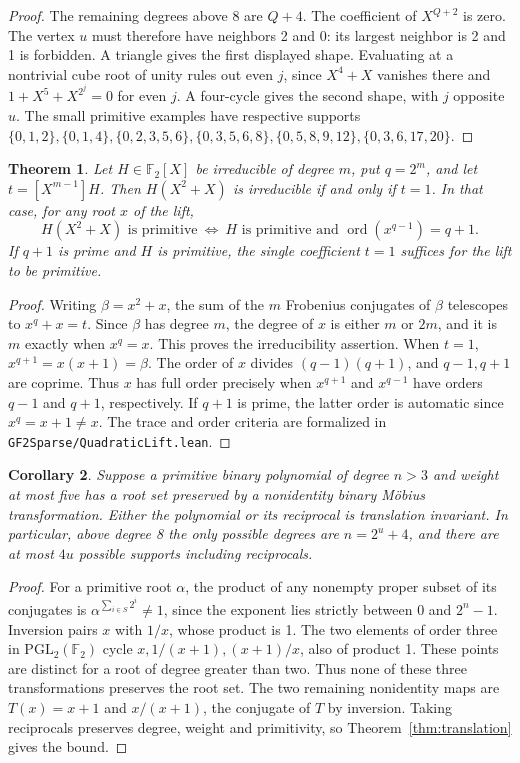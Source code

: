\documentclass[11pt]{article}
\newtheorem{theorem}{Theorem}
\newtheorem{corollary}[theorem]{Corollary}
\newcommand{\F}{\mathbb F_2}
\newcommand{\ord}{\operatorname{ord}}
\begin{document}
\begin{proof}
The remaining degrees above 8 are \(Q+4\). The coefficient of
\(X^{Q+2}\) is zero. The vertex \(u\) must therefore have neighbors
2 and 0: its largest neighbor is 2 and 1 is forbidden. A triangle
gives the first displayed shape. Evaluating at a nontrivial cube
root of unity rules out even \(j\), since \(X^4+X\) vanishes
there and \(1+X^5+X^{2^j}=0\) for even \(j\).
A four-cycle gives the second shape, with \(j\) opposite \(u\).
The small primitive examples have respective supports
\(\{0,1,2\},\{0,1,4\},\{0,2,3,5,6\},\{0,3,5,6,8\},
\{0,5,8,9,12\},\{0,3,6,17,20\}\).
\end{proof}

\begin{theorem}\label{thm:lift-order}
Let \(H\in\F[X]\) be irreducible of degree \(m\), put \(q=2^m\), and
let \(t=[X^{m-1}]H\). Then \(H(X^2+X)\) is irreducible if and only
if \(t=1\). In that case, for any root \(x\) of the lift,
\[
 H(X^2+X)\text{ is primitive}
 \ \Longleftrightarrow\ H\text{ is primitive and }\ord(x^{q-1})=q+1 .
\]
If \(q+1\) is prime and \(H\) is primitive, the single coefficient
\(t=1\) suffices for the lift to be primitive.
\end{theorem}
\begin{proof}
Writing \(\beta=x^2+x\), the sum of the \(m\) Frobenius conjugates
of \(\beta\) telescopes to \(x^q+x=t\). Since \(\beta\) has degree
\(m\), the degree of \(x\) is either \(m\) or \(2m\), and it is \(m\)
exactly when \(x^q=x\). This proves the irreducibility assertion.
When \(t=1\), \(x^{q+1}=x(x+1)=\beta\). The order of \(x\) divides
\((q-1)(q+1)\), and \(q-1,q+1\) are coprime. Thus \(x\) has full
order precisely when \(x^{q+1}\) and \(x^{q-1}\) have orders
\(q-1\) and \(q+1\), respectively. If \(q+1\) is prime, the latter
order is automatic since \(x^q=x+1\ne x\). The trace and order
criteria are formalized in \texttt{GF2Sparse/QuadraticLift.lean}.
\end{proof}

\begin{corollary}\label{cor:mobius}
Suppose a primitive binary polynomial of degree \(n>3\) and weight
at most five has a root set preserved by a nonidentity binary
Möbius transformation. Either the polynomial or its reciprocal is
translation invariant. In particular, above degree 8 the only possible
degrees are \(n=2^u+4\), and there are at most \(4u\) possible supports
including reciprocals.
\end{corollary}
\begin{proof}
For a primitive root \(\alpha\), the product of any nonempty proper
subset of its conjugates is \(\alpha^{\sum_{i\in S}2^i}\ne1\), since
the exponent lies strictly between 0 and \(2^n-1\).
Inversion pairs \(x\) with \(1/x\), whose product is 1. The two elements
of order three in \(\mathrm{PGL}_2(\F)\) cycle
\(x,1/(x+1),(x+1)/x\), also of product 1. These points are distinct
for a root of degree greater than two. Thus none of these three
transformations preserves the root set. The two remaining
nonidentity maps are \(T(x)=x+1\) and \(x/(x+1)\), the conjugate of
\(T\) by inversion. Taking reciprocals preserves degree, weight and
primitivity, so Theorem~\ref{thm:translation} gives the bound.
\end{proof}
\end{document}
